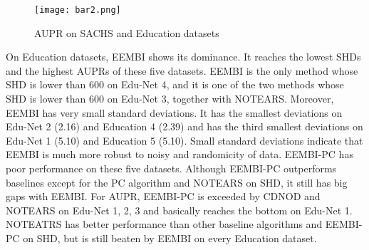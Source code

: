 \documentclass[twoside,11pt]{article}
\begin{document}
\begin{table*}[htpb]
\centering
\fontsize{10}{22}\selectfont
\caption{SHD on SAHCS and Education datasets}\label{Education SHD}
\end{table*}


\begin{figure*}
\centering
\texttt{[image: bar2.png]}
\caption{AUPR on SACHS and Education datasets}\label{Education AUPR}
\end{figure*}


On Education datasets, EEMBI shows its dominance. It reaches the lowest SHDs and the highest AUPRs of these five datasets. EEMBI is the only method whose SHD is lower than 600 on Edu-Net 4, and it is one of the two methods whose SHD is lower than 600 on Edu-Net 3, together with NOTEARS. Moreover, EEMBI has very small standard deviations. It has the smallest deviations on Edu-Net 2 (2.16) and Education 4 (2.39) and has the third smallest deviations on Edu-Net 1 (5.10) and Education 5 (5.10). Small standard deviations indicate that EEMBI is much more robust to noisy and randomicity of data. EEMBI-PC has poor performance on these five datasets. Although EEMBI-PC outperforms baselines except for the PC algorithm and NOTEARS on SHD, it still has big gaps with EEMBI. For AUPR, EEMBI-PC is exceeded by CDNOD and NOTEARS on Edu-Net 1, 2, 3 and basically reaches the bottom on Edu-Net 1. NOTEATRS has better performance than other baseline algorithms and EEMBI-PC on SHD, but is still beaten by EEMBI on every Education dataset.
\end{document}
